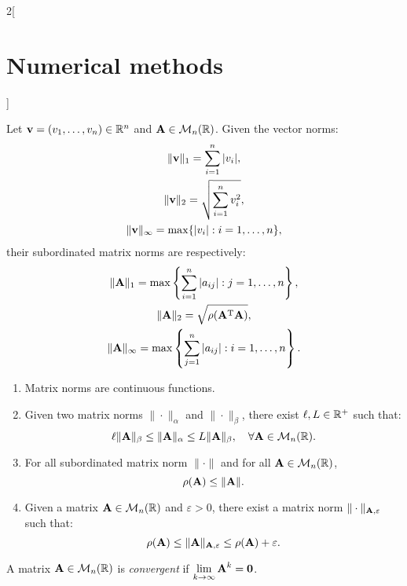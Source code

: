 \documentclass[../../../main.tex]{subfiles}
\begin{document}
\begin{multicols}{2}[\section{Numerical methods}]
\begin{definition}
\end{definition}
\begin{prop}
    Let $\vb{v}=(v_1,\ldots,v_n)\in\mathbb{R}^n$ and $\vb{A}\in\mathcal{M}_n(\mathbb{R})$. Given the vector norms: 
    \begin{gather*}
        \|\vb{v}\|_1=\sum_{i=1}^n|v_i|,\\
        \|\vb{v}\|_2=\sqrt{\sum_{i=1}^nv_i^2},\\
        \|\vb{v}\|_\infty=\max\{|v_i|:i=1,\ldots,n\},
    \end{gather*}
    their subordinated matrix norms are respectively:
    \begin{gather*}
        \|\vb{A}\|_1=\max\left\{\sum_{i=1}^n|a_{ij}|:j=1,\ldots,n\right\},\\
        \|\vb{A}\|_2=\sqrt{\rho(\vb{A}^{\mathrm{T}}\vb{A})},\\
        \|\vb{A}\|_\infty=\max\left\{\sum_{j=1}^n|a_{ij}|:i=1,\ldots,n\right\}.
    \end{gather*}
\end{prop}
\begin{prop}
    \hfill
    \begin{enumerate}
        \item Matrix norms are continuous functions.
        \item Given two matrix norms $\|\cdot\|_\alpha$ and $\|\cdot\|_\beta$, there exist $\ell, L\in\mathbb{R}^+$ such that: $$\ell \|\vb{A}\|_\beta\leq\|\vb{A}\|_\alpha\leq L\|\vb{A}\|_\beta,\quad\forall\vb{A}\in\mathcal{M}_n(\mathbb{R}).$$
        \item For all subordinated matrix norm $\|\cdot\|$ and for all $\vb{A}\in\mathcal{M}_n(\mathbb{R})$, $$\rho(\vb{A})\leq\|\vb{A}\|.$$
        \item Given a matrix $\vb{A}\in\mathcal{M}_n(\mathbb{R})$ and $\varepsilon>0$, there exist a matrix norm $\|\cdot\|_{\vb{A},\varepsilon}$ such that: $$\rho(\vb{A})\leq\|\vb{A}\|_{\vb{A},\varepsilon}\leq\rho(\vb{A})+\varepsilon.$$
    \end{enumerate}
\end{prop}
\begin{definition}
    A matrix $\vb{A}\in\mathcal{M}_n(\mathbb{R})$ is \textit{convergent} if $\displaystyle\lim_{k\to\infty}\vb{A}^k=\vb{0}$.  
\end{definition}
\begin{theorem}

\end{theorem}
\end{multicols}
\end{document}
